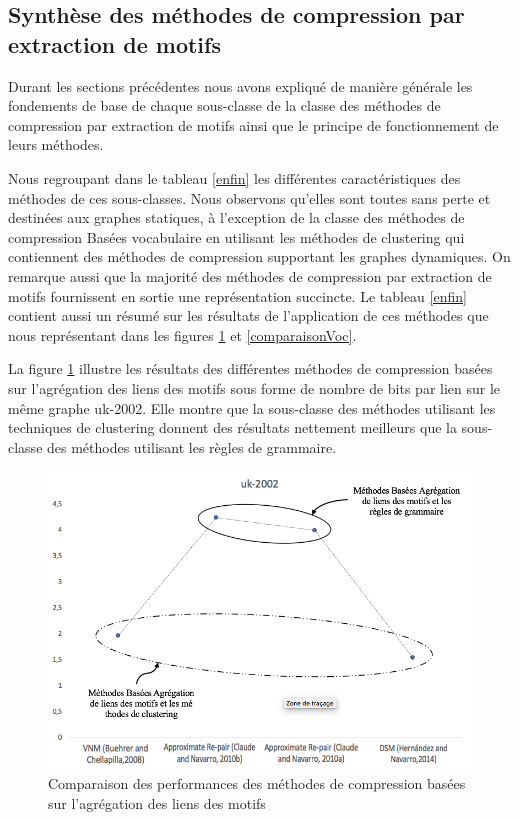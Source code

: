 \subsection{Synthèse des méthodes de compression par extraction de motifs }

	Durant les sections précédentes nous avons expliqué de manière générale les fondements de base de chaque sous-classe de la classe des méthodes de compression par extraction de motifs ainsi que le principe de fonctionnement de leurs méthodes. 
	
	Nous regroupant dans le tableau \ref{enfin} les différentes caractéristiques des méthodes de ces sous-classes. Nous observons qu'elles sont toutes sans perte et destinées aux graphes statiques, à l'exception de la classe des méthodes de compression Basées vocabulaire en utilisant les méthodes de clustering qui contiennent des méthodes de compression supportant les graphes dynamiques. On remarque aussi que la majorité des méthodes de compression par extraction de motifs fournissent en sortie une représentation succincte. Le tableau \ref{enfin} contient aussi un résumé sur les résultats de l'application de ces méthodes que nous représentant dans les figures \ref{comparaison} et \ref{comparaisonVoc}.
	
	La figure \ref{comparaison} illustre les résultats des différentes méthodes de compression basées sur l'agrégation des liens des motifs sous forme de nombre de bits par lien sur le même graphe uk-2002. Elle montre que la sous-classe des méthodes utilisant les techniques de clustering donnent des résultats nettement meilleurs que la sous-classe des méthodes utilisant les règles de grammaire.
	
								\begin{figure}[H]
					\includegraphics[scale=0.5]{ressources/image/edge.png} 
					\centering
					\caption{Comparaison des performances des méthodes de compression basées sur l'agrégation des liens des motifs}
					\label{comparaison}
				\end{figure}
				
